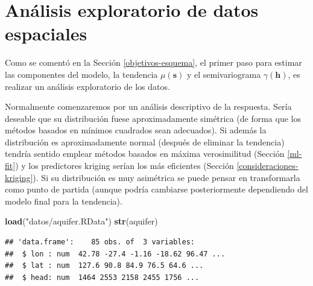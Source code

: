 \documentclass[
]{book}
\newenvironment{Shaded}{\begin{snugshade}}{\end{snugshade}}
\newcommand{\AttributeTok}[1]{\textcolor[rgb]{0.13,0.29,0.53}{#1}}
\newcommand{\DecValTok}[1]{\textcolor[rgb]{0.00,0.00,0.81}{#1}}
\newcommand{\FunctionTok}[1]{\textcolor[rgb]{0.13,0.29,0.53}{\textbf{#1}}}
\newcommand{\NormalTok}[1]{#1}
\newcommand{\OtherTok}[1]{\textcolor[rgb]{0.56,0.35,0.01}{#1}}
\newcommand{\SpecialCharTok}[1]{\textcolor[rgb]{0.81,0.36,0.00}{\textbf{#1}}}
\newcommand{\StringTok}[1]{\textcolor[rgb]{0.31,0.60,0.02}{#1}}
\theoremstyle{break}
\theoremstyle{definition}
\theoremstyle{definition}
\theoremstyle{definition}
\theoremstyle{definition}
\theoremstyle{remark}
\begin{document}
\section{Análisis exploratorio de datos espaciales}\label{sp-eda}

Como se comentó en la Sección \ref{objetivos-esquema}, el primer paso para estimar las componentes del modelo, la tendencia \(\mu(\mathbf{s})\) y el semivariograma \(\gamma(\mathbf{h})\), es realizar un análisis exploratorio de los datos.

Normalmente comenzaremos por un análisis descriptivo de la respuesta.
Sería deseable que su distribución fuese aproximadamente simétrica (de forma que los métodos basados en mínimos cuadrados sean adecuados).
Si además la distribución es aproximadamente normal (después de eliminar la tendencia) tendría sentido emplear métodos basados en máxima verosimilitud (Sección \ref{ml-fit}) y los predictores kriging serían los más eficientes (Sección \ref{consideraciones-kriging}).
Si su distribución es muy asimétrica se puede pensar en transformarla como punto de partida (aunque podría cambiarse posteriormente dependiendo del modelo final para la tendencia).

\begin{Shaded}
\begin{Highlighting}[]
\FunctionTok{load}\NormalTok{(}\StringTok{"datos/aquifer.RData"}\NormalTok{)}
\FunctionTok{str}\NormalTok{(aquifer)}
\end{Highlighting}
\end{Shaded}

\begin{verbatim}
## 'data.frame':    85 obs. of  3 variables:
##  $ lon : num  42.78 -27.4 -1.16 -18.62 96.47 ...
##  $ lat : num  127.6 90.8 84.9 76.5 64.6 ...
##  $ head: num  1464 2553 2158 2455 1756 ...
\end{verbatim}

\begin{Shaded}
\end{Shaded}
\end{document}
